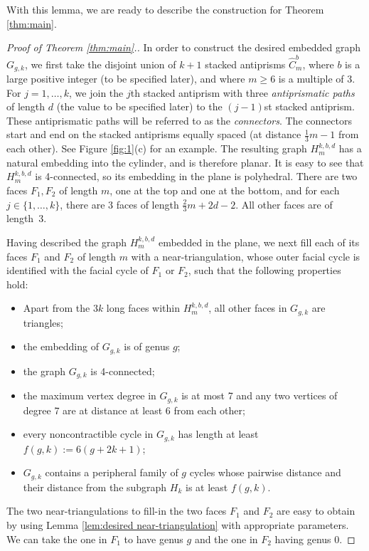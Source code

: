 \documentclass[11pt]{article}
\begin{document}
With this lemma, we are ready to describe the construction for Theorem \ref{thm:main}.

\begin{proof}[Proof of Theorem \ref{thm:main}.]
  In order to construct the desired embedded graph $G_{g,k}$, we first take the disjoint union of $k+1$ stacked antiprisms $\widehat{C}_m^b$, where $b$ is a large positive integer (to be specified later), and where $m\ge6$ is a multiple of 3. For $j=1,\dots,k$, we join the $j$th stacked antiprism with three \emph{antiprismatic paths} of length $d$ (the value to be specified later) to the $(j-1)$st stacked antiprism. These antiprismatic paths will be referred to as the \emph{connectors}. The connectors start and end on the stacked antiprisms equally spaced (at distance $\tfrac{1}{3}m-1$ from each other). See Figure \ref{fig:1}(c) for an example. The resulting graph $H_m^{k,b,d}$ has a natural embedding into the cylinder, and is therefore planar. It is easy to see that $H_m^{k,b,d}$ is 4-connected, so its embedding in the plane is polyhedral. There are two faces $F_1,F_2$ of length $m$, one at the top and one at the bottom, and for each $j\in \{1,\dots,k\}$, there are $3$ faces of length $\tfrac{2}{3}m+2d-2$. All other faces are of length~$3$.

  Having described the graph $H_m^{k,b,d}$ embedded in the plane, we next fill each of its faces $F_1$ and $F_2$ of length $m$ with a near-triangulation, whose outer facial cycle is identified with the facial cycle of $F_1$ or $F_2$, such that the following properties hold:
  \begin{itemize}
   \item[(a)] Apart from the $3k$ long faces within $H_m^{k,b,d}$, all other faces in $G_{g,k}$ are triangles;
   \item[(b)] the embedding of $G_{g,k}$ is of genus $g$;
   \item[(c)] the graph $G_{g,k}$ is 4-connected;
   \item[(d)] the maximum vertex degree in $G_{g,k}$ is at most 7 and any two vertices of degree 7 are at distance at least 6 from each other;
   \item[(e)] every noncontractible cycle in $G_{g,k}$ has length at least $f(g,k):=6(g+2k+1)$;
   \item[(f)] $G_{g,k}$ contains a peripheral family of $g$ cycles whose pairwise distance and their distance from the subgraph $H_k$ is at least $f(g,k)$.
  \end{itemize}
  The two near-triangulations to fill-in the two faces $F_1$ and $F_2$ are easy to obtain by using Lemma \ref{lem:desired near-triangulation} with appropriate parameters. We can take the one in $F_1$ to have genus $g$ and the one in $F_2$ having genus 0. 
  

\end{proof}
\end{document}
